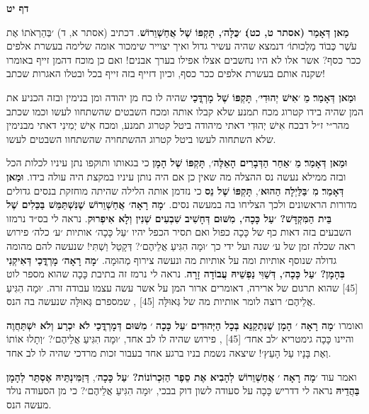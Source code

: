 \documentclass[12pt, openany]{book}
\newcommand{\sethebfont}{
\fontsize{10.5pt}{13.1pt} \selectfont
}
\newcommand{\twocol}[1]{
	{\sethebfont \begin{multicols}{2}
			#1
	\end{multicols}}	
}
\newcommand{\sectname}{}
\newcommand{\newsection}[1]{
	\renewcommand{\sectname}{#1}	
	\vspace{-\baselineskip}
	\begin{center}
		\textbf{%
\fontsize{16pt}{16pt}\selectfont
			#1}
	\end{center}
	\vspace{-\baselineskip}
	\nopagebreak
}
\begin{document}
\newsection{דף יט}
\twocol{\textbf{מַאן דְּאָמַר {\small (אסתר ט, כט)}׃ ׳כֻּלָּה׳, תָּקְפּוֹ שֶׁל אֲחַשְׁוֵרוֹשׁ}. דכתיב {\small (אסתר א, ד)} ׳בְּהַרְאֹתוֹ אֶת עֹשֶׁר כְּבוֹד מַלְכוּתוֹ׳ דנמצא שהיה עשיר גדול ואיך יצוייר שימכור אומה שלימה בעשרת אלפים ככר כסף? אשר אלו לא היו נחשבים אצלו אפילו בערך אבנים! ואם כן מוכח דהמן זייף באומרו שקנה אותם בעשרת אלפים ככר כסף, וכיון דזייף בזה זייף בכל ובטלו האגרות שכתב!\par \textbf{וּמַאן דְּאָמַר}׃ \textbf{מֵ} ׳\textbf{אִישׁ יְהוּדִי}׳, \textbf{תָּקְפּוֹ שֶׁל מָרְדֳּכַי} שהיה לו כח מן יהודה ומן בנימין ובזה הכניע את המן שהיה בידו קטרוג מכח תמנע שלא קבלו אותה ומכח השבטים שהשתחוו לעשו וכמו שכתב מהר״י ז״ל דבכח אִישׁ יְהוּדִי דאתי מיהודה ביטל קטרוג תמנע, ומכח אִישׁ יְמִינִי דאתי מבנימין שלא השתחוה לעשו ביטל קטרוג ההשתחויה שהשתחוו השבטים לעשו.\par \textbf{וּמַאן דְּאָמַר}׃ \textbf{מֵ} ׳\textbf{אַחַר הַדְּבָרִים הָאֵלֶּה}׳, \textbf{תָּקְפּוֹ שֶׁל הָמָן} כי בגאותו ותוקפו נתן עיניו לכלות הכל ובזה ממילא נעשה נס ההצלה מה שאין כן אם היה נותן עיניו במקצת היה עולה בידו. \textbf{וּמַאן דְּאָמַר}׃ \textbf{מִ} ׳\textbf{בַּלַּיְלָה הַהוּא}׳, \textbf{תָּקְפּוֹ שֶׁל נֵס} כי נזדמן אותה הלילה שהיתה מוחזקת בנסים גדולים מדורות הראשונים ולכך הצליחו בה במעשה נסים.
\textbf{׳מָה רָאָה׳ אֲחַשְׁוֵרוֹשׁ שֶׁנִּשְׁתַּמֵּשׁ בַּכֵּלִים שֶׁל בֵּית הַמִּקְדָּשׁ? ׳עַל כָּכָה׳, מִשּׁוּם דְּחָשִׁיב שִׁבְעִים שְׁנִין וְלָא אִיפְרוּק}. נראה לי בס״ד נרמזו השבעים בזה דאות כף של כָּכָה כפול ואם תסיר הכפל יהיו ׳עַל כָּכָה׳ אותיות ׳ע׳ כלה׳ פירוש ראה שכלה זמן של ע׳ שנה ועל ידי כך ׳וּמָה הִגִּיעַ אֲלֵיהֶם׳? דְּקָטַל וַשְׁתִּי! שנעשה להם מהומה גדולה שנוסף אותיות ומה על אותיות מה ונעשה צירוף מְהוּמָה.
\textbf{׳מָה רָאָה׳ מָרְדֳּכַי דְּאִיקְנִי בְּהָמָן? ׳עַל כָּכָה׳, דְּשַׁוִּי נַפְשֵׁיהּ עֲבוֹדָה זָרָה}. נראה לי נרמז זה בתיבת כָּכָה שהוא מספר לוט {\small [45]} שהוא תרגום של ארירה, דאומרים ארור המן על אשר עשה עצמו עבודה זרה. ׳וּמָה הִגִּיעַ אֲלֵיהֶם׳ רוצה לומר אותיות מה של גְּאוּלָּה {\small [45]} , שמספרם גְּאוּלָּה שנעשה בה הנס.\par ואומרו ׳\textbf{מָה רָאָה} ׳ \textbf{הָמָן שֶׁנִּתְקַנֵּא בְּכָל הַיְּהוּדִים} ׳\textbf{עַל כָּכָה} ׳ \textbf{מִשּׁוּם דְּמָרְדֳּכַי לֹא יִכְרַע וְלֹא יִשְׁתַּחֲוֶה} והיינו כָּכָה גימטריא ׳לב אחד׳ {\small [45]} , פירוש שהיה לו לב אחד, ׳וּמָה הִגִּיעַ אֲלֵיהֶם׳? ׳וְתָלוּ אוֹתוֹ וְאֶת בָּנָיו עַל הָעֵץ׳! שיצאה נשמת בניו ברגע אחד בעבור זכות מרדכי שהיה לו לב אחד.\par ואמר עוד ׳\textbf{מָה רָאָה} ׳ \textbf{אֲחַשְׁוֵרוֹשׁ לְהָבִיא אֶת סֵפֶר הַזִּכְרוֹנוֹת?} ׳\textbf{עַל כָּכָה}׳, \textbf{דְּזַמִּינְתֵּיהּ אֶסְתֵּר לְהָמָן בַּהֲדֵיהּ} נראה לי דדריש כָּכָה על סעודה לשון דוק בבכי, ׳וּמָה הִגִּיעַ אֲלֵיהֶם׳? כי מן הסעודה נולד מעשה הנס.
\clearpage}
\end{document}

